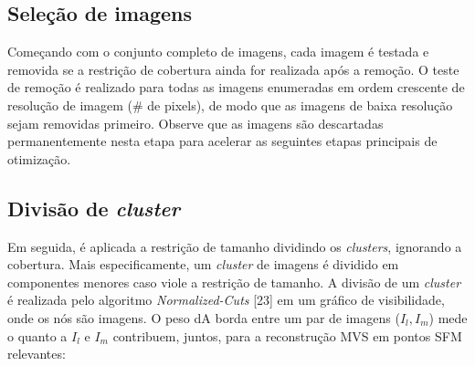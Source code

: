 \subsection{Seleção de imagens}

Começando com o conjunto completo de imagens, cada imagem é testada e removida se a restrição de cobertura ainda for realizada após a remoção. O teste de remoção é realizado para todas as imagens enumeradas em ordem crescente de resolução de imagem (# de pixels), de modo que as imagens de baixa resolução sejam removidas primeiro. Observe que as imagens são descartadas permanentemente nesta etapa para acelerar as seguintes etapas principais de otimização.

\subsection{Divisão de {\it cluster}}

Em seguida, é aplicada a restrição de tamanho dividindo os {\it clusters}, ignorando a cobertura. Mais especificamente, um {\it cluster} de imagens é dividido em componentes menores caso viole a restrição de tamanho. A divisão de um {\it cluster} é realizada pelo algoritmo {\it Normalized-Cuts} %
[23] em um gráfico de visibilidade, onde os nós são imagens. O peso dA borda entre um par de imagens ($I_l, I_m$) mede o quanto a $I_l$ e $I_m$ contribuem, juntos,  para a reconstrução MVS em pontos SFM relevantes: 

